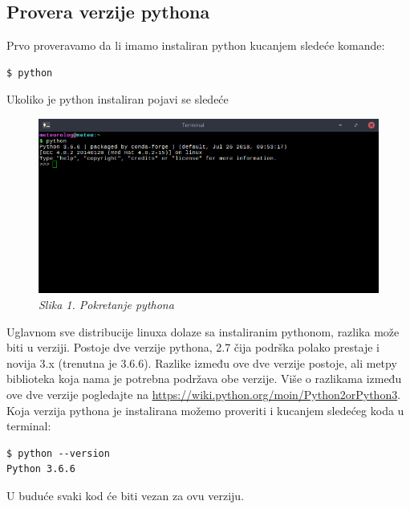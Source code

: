\documentclass[12pt]{article}
\begin{document}
\subsection{Provera verzije pythona}
Prvo proveravamo da li imamo instaliran python kucanjem sledeće komande:
\begin{lstlisting}
$ python 
\end{lstlisting}
Ukoliko je python instaliran pojavi se sledeće
\begin{figure}[h!]
\centering
\includegraphics[width=1.\linewidth]{python.png}
\caption*{\textsl{Slika 1. Pokretanje pythona}}
\end{figure}
Uglavnom sve distribucije linuxa dolaze sa instaliranim pythonom, razlika može biti u verziji. Postoje dve verzije pythona, 2.7 čija podrška polako prestaje i novija 3.x (trenutna je 3.6.6). Razlike između ove dve verzije postoje, ali metpy biblioteka koja nama je potrebna podržava obe verzije. Više o razlikama između ove dve verzije pogledajte na \url{https://wiki.python.org/moin/Python2orPython3}. Koja verzija pythona je instalirana možemo proveriti i kucanjem sledećeg koda u terminal:
\begin{lstlisting}
$ python --version
Python 3.6.6
\end{lstlisting}  
U buduće svaki kod će biti vezan za ovu verziju.
\end{document}
